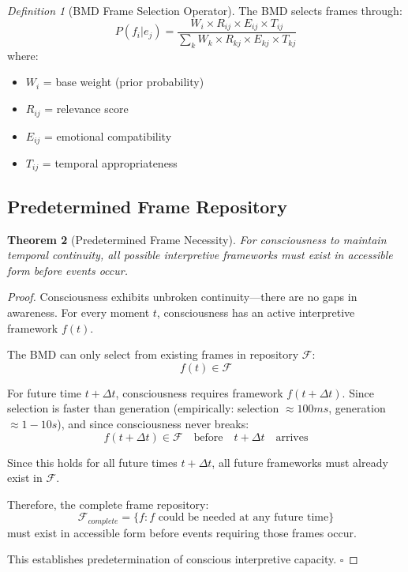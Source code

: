 \documentclass[12pt]{article}
\newtheorem{theorem}{Theorem}[section]
\theoremstyle{definition}
\newtheorem{definition}[theorem]{Definition}
\theoremstyle{remark}
\newtheorem{definition}[theorem]{Definition}
\begin{document}
\begin{definition}[BMD Frame Selection Operator]
The BMD selects frames through:
\begin{equation}
P(f_i | e_j) = \frac{W_i \times R_{ij} \times E_{ij} \times T_{ij}}{\sum_k W_k \times R_{kj} \times E_{kj} \times T_{kj}}
\end{equation}
where:
\begin{itemize}
\item $W_i$ = base weight (prior probability)
\item $R_{ij}$ = relevance score
\item $E_{ij}$ = emotional compatibility
\item $T_{ij}$ = temporal appropriateness
\end{itemize}
\end{definition}

\subsection{Predetermined Frame Repository}

\begin{theorem}[Predetermined Frame Necessity]
\label{thm:predetermined_frames}
For consciousness to maintain temporal continuity, all possible interpretive frameworks must exist in accessible form before events occur.
\end{theorem}

\begin{proof}
Consciousness exhibits unbroken continuity—there are no gaps in awareness. For every moment $t$, consciousness has an active interpretive framework $f(t)$.

The BMD can only select from existing frames in repository $\mathcal{F}$:
\begin{equation}
f(t) \in \mathcal{F}
\end{equation}

For future time $t + \Delta t$, consciousness requires framework $f(t + \Delta t)$. Since selection is faster than generation (empirically: selection $\approx 100ms$, generation $\approx 1-10s$), and since consciousness never breaks:
\begin{equation}
f(t + \Delta t) \in \mathcal{F} \quad \text{before} \quad t + \Delta t \quad \text{arrives}
\end{equation}

Since this holds for all future times $t + \Delta t$, all future frameworks must already exist in $\mathcal{F}$.

Therefore, the complete frame repository:
\begin{equation}
\mathcal{F}_{complete} = \{f : f \text{ could be needed at any future time}\}
\end{equation}
must exist in accessible form before events requiring those frames occur.

This establishes predetermination of conscious interpretive capacity. $\square$
\end{proof}
\end{document}
